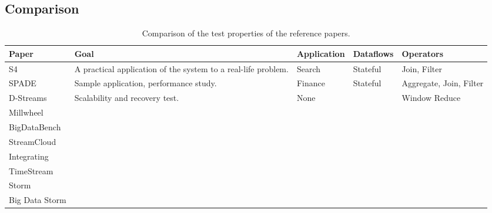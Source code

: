 \subsection{Comparison}
\begin{table}[H]
  \centering
  {
    \scriptsize
    \hspace*{-1.5cm}
    \begin{tabularx}{0.85\pagewidth}{|l|X|l|l|l|}
      \hline
      Paper & Goal & Application & Dataflows & Operators
      \\\hline
      
      S4\cite{s4}
      & A practical application of the system to a real-life problem.
      & Search
      & Stateful
      & Join, Filter
      \\\hline
      
      SPADE\cite{spade}
      & Sample application, performance study.
      & Finance
      & Stateful
      & Aggregate, Join, Filter
      \\\hline

      D-Streams\cite{discretized}
      & Scalability and recovery test.
      & None
      & 
      & Window Reduce
      \\\hline

      Millwheel\cite{millwheel}
      &
      &
      &
      &
      \\\hline

      BigDataBench\cite{bigdatabench}
      &
      &
      &
      &
      \\\hline

      StreamCloud\cite{streamcloud}
      &
      &
      &
      &
      \\\hline

      Integrating\cite{integrating}
      &
      &
      &
      &
      \\\hline

      TimeStream\cite{timestream}
      &
      &
      &
      &
      \\\hline

      Storm\cite{storm}
      &
      &
      &
      &
      \\\hline

      Big Data Storm\cite{storm2}
      &
      &
      &
      &
      \\\hline
    \end{tabularx}
  }
  \caption{Comparison of the test properties of the reference papers.}
\end{table}

